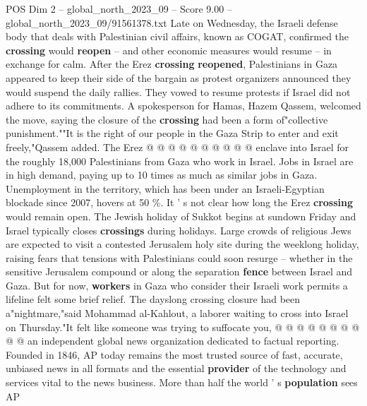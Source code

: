 \begin{textsample}{POS Dim 2 – global\_north\_2023\_09 – Score 9.00 – global\_north\_2023\_09/91561378.txt}
Late on Wednesday, the Israeli defense body that deals with Palestinian civil affairs, known as COGAT, confirmed the \textbf{crossing} would \textbf{reopen} -- and other economic measures would resume -- in exchange for calm.
After the Erez \textbf{crossing} \textbf{reopened}, Palestinians in Gaza appeared to keep their side of the bargain as protest organizers announced they would suspend the daily rallies.
They vowed to resume protests if Israel did not adhere to its commitments.
A spokesperson for Hamas, Hazem Qassem, welcomed the move, saying the closure of the \textbf{crossing} had been a form of"collective punishment.""It is the right of our people in the Gaza Strip to enter and exit freely,"Qassem added.
The Erez @ @ @ @ @ @ @ @ @ @ enclave into Israel for the roughly 18,000 Palestinians from Gaza who work in Israel.
Jobs in Israel are in high demand, paying up to 10 times as much as similar jobs in Gaza.
Unemployment in the territory, which has been under an Israeli-Egyptian blockade since 2007, hovers at 50 \%.
It ' s not clear how long the Erez \textbf{crossing} would remain open.
The Jewish holiday of Sukkot begins at sundown Friday and Israel typically closes \textbf{crossings} during holidays.
Large crowds of religious Jews are expected to visit a contested Jerusalem holy site during the weeklong holiday, raising fears that tensions with Palestinians could soon resurge -- whether in the sensitive Jerusalem compound or along the separation \textbf{fence} between Israel and Gaza.
But for now, \textbf{workers} in Gaza who consider their Israeli work permits a lifeline felt some brief relief.
The dayslong crossing closure had been a"nightmare,"said Mohammad al-Kahlout, a laborer waiting to cross into Israel on Thursday."It felt like someone was trying to suffocate you, @ @ @ @ @ @ @ @ @ @ an independent global news organization dedicated to factual reporting.
Founded in 1846, AP today remains the most trusted source of fast, accurate, unbiased news in all formats and the essential \textbf{provider} of the technology and services vital to the news business.
More than half the world ' s \textbf{population} sees AP

\end{textsample}
